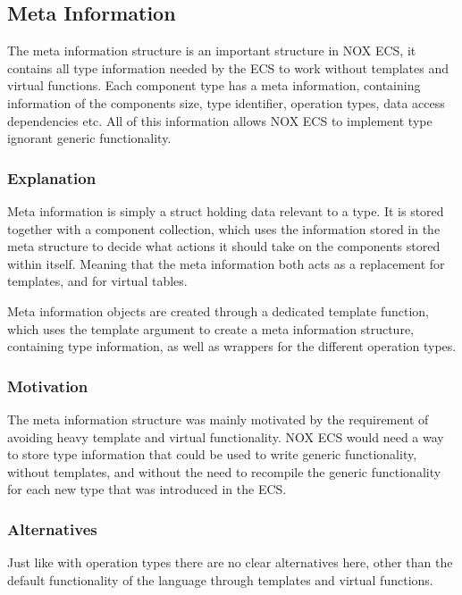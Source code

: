 \subsection{Meta Information}
\label{subsec:detailed_meta_information}
The meta information structure is an important structure in NOX ECS,
it contains all type information needed by the ECS to work without
templates and virtual functions.
Each component type has a meta information, containing information
of the components size, type identifier,
operation types, data access dependencies etc.
All of this information allows NOX ECS to implement type ignorant generic functionality.

\subsubsection{Explanation}
Meta information is simply a struct holding data relevant to a type.
It is stored together with a component collection,
which uses the information stored in the meta structure to decide what actions
it should take on the components stored within itself.
Meaning that the meta information both acts as a replacement for templates,
and for virtual tables.

Meta information objects are created through a dedicated template function,
which uses the template argument to create a meta information structure,
containing type information, as well as wrappers for the different operation types.

\subsubsection{Motivation}
The meta information structure was mainly motivated by the requirement of avoiding heavy template and virtual functionality.
NOX ECS would need a way to store type information that could be used to write generic functionality, without templates,
and without the need to recompile the generic functionality for each new type that was introduced in the ECS.

\subsubsection{Alternatives}
Just like with operation types there are no clear alternatives here, other than
the default functionality of the language through templates and virtual functions.


